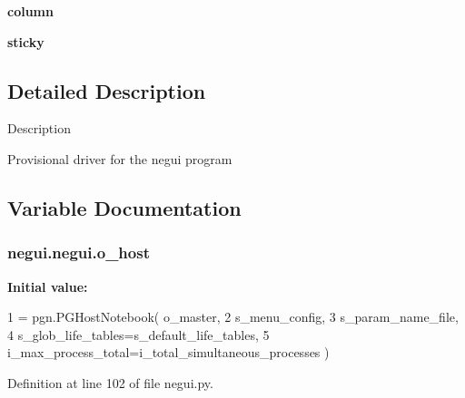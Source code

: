 \begin{DoxyCompactItemize}
\item 
{\bfseries column}\hypertarget{namespacenegui_1_1negui_a98244dd0790e996e2c692c294289f11d}{}\label{namespacenegui_1_1negui_a98244dd0790e996e2c692c294289f11d}

\item 
{\bfseries sticky}\hypertarget{namespacenegui_1_1negui_a1ce52a3e7a52079e56727952c374fb22}{}\label{namespacenegui_1_1negui_a1ce52a3e7a52079e56727952c374fb22}

\end{DoxyCompactItemize}


\subsection{Detailed Description}
\begin{DoxyVerb}Description

Provisional driver for the negui program
\end{DoxyVerb}
 

\subsection{Variable Documentation}
\subsubsection[{\texorpdfstring{o\+\_\+host}{o_host}}]{\setlength{\rightskip}{0pt plus 5cm}negui.\+negui.\+o\+\_\+host}\hypertarget{namespacenegui_1_1negui_ad01236b6cf0c010c914df1d7ee1c96a1}{}\label{namespacenegui_1_1negui_ad01236b6cf0c010c914df1d7ee1c96a1}
{\bfseries Initial value\+:}
\begin{DoxyCode}
1 = pgn.PGHostNotebook( o\_master, 
2             s\_menu\_config, 
3             s\_param\_name\_file, 
4             s\_glob\_life\_tables=s\_default\_life\_tables,
5             i\_max\_process\_total=i\_total\_simultaneous\_processes )
\end{DoxyCode}


Definition at line 102 of file negui.\+py.

